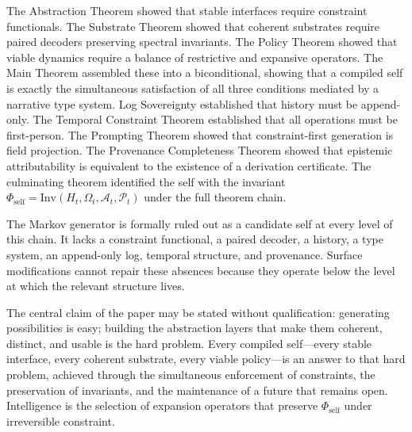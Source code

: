 \documentclass[12pt, a4paper]{article}
\theoremstyle{plain}
\theoremstyle{definition}
\theoremstyle{remark}
\begin{document}
The Abstraction Theorem showed that stable interfaces require constraint functionals. The Substrate Theorem showed that coherent substrates require paired decoders preserving spectral invariants. The Policy Theorem showed that viable dynamics require a balance of restrictive and expansive operators. The Main Theorem assembled these into a biconditional, showing that a compiled self is exactly the simultaneous satisfaction of all three conditions mediated by a narrative type system. Log Sovereignty established that history must be append-only. The Temporal Constraint Theorem established that all operations must be first-person. The Prompting Theorem showed that constraint-first generation is field projection. The Provenance Completeness Theorem showed that epistemic attributability is equivalent to the existence of a derivation certificate. The culminating theorem identified the self with the invariant $\Phi_{\mathrm{self}} = \mathrm{Inv}(H_t, \Omega_t, \mathcal{A}_t, \mathcal{P}_t)$ under the full theorem chain.

The Markov generator is formally ruled out as a candidate self at every level of this chain. It lacks a constraint functional, a paired decoder, a history, a type system, an append-only log, temporal structure, and provenance. Surface modifications cannot repair these absences because they operate below the level at which the relevant structure lives.

The central claim of the paper may be stated without qualification: generating possibilities is easy; building the abstraction layers that make them coherent, distinct, and usable is the hard problem. Every compiled self---every stable interface, every coherent substrate, every viable policy---is an answer to that hard problem, achieved through the simultaneous enforcement of constraints, the preservation of invariants, and the maintenance of a future that remains open. Intelligence is the selection of expansion operators that preserve $\Phi_{\mathrm{self}}$ under irreversible constraint.
\end{document}

